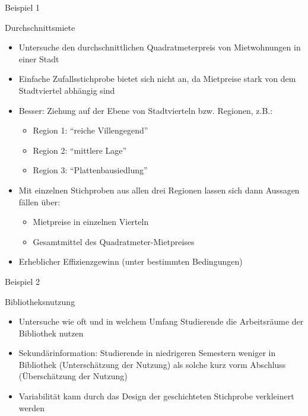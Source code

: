 \documentclass[9pt]{beamer}
\begin{document}
\begin{frame}{Beispiel 1}
\begin{block}{Durchschnittsmiete}
	\begin{itemize}
		\item Untersuche den durchschnittlichen Quadratmeterpreis von Mietwohnungen in einer Stadt
		\item Einfache Zufallsstichprobe bietet sich nicht an, da Mietpreise stark von dem Stadtviertel abhängig sind
		\item Besser: Ziehung auf der Ebene von Stadtvierteln bzw. Regionen, z.B.:
		\begin{itemize}
			\item Region 1: \enquote{reiche	Villengegend} 
			\item Region 2: \enquote{mittlere Lage}
			\item Region 3: \enquote{Plattenbausiedlung}			
		\end{itemize}
		\item Mit einzelnen Stichproben aus allen drei Regionen lassen sich dann Aussagen fällen über:
		\begin{itemize}
			\item Mietpreise in einzelnen Vierteln
			\item Gesamtmittel des Quadratmeter-Mietpreises
		\end{itemize}
		\item Erheblicher Effizienzgewinn (unter bestimmten Bedingungen)
	\end{itemize}
\end{block}
\end{frame}

\begin{frame}{Beispiel 2}
\begin{block}{Bibliotheksnutzung}
	\begin{itemize}
		\item Untersuche wie oft und in welchem	Umfang Studierende die Arbeitsräume der Bibliothek nutzen
		\item Sekundärinformation: Studierende in niedrigeren Semestern weniger in Bibliothek (Unterschätzung der Nutzung) als solche kurz vorm Abschluss (Überschätzung der Nutzung)
		\item Variabilität kann durch das Design der geschichteten Stichprobe verkleinert werden
	\end{itemize}
\end{block}
\end{frame}
\end{document}
